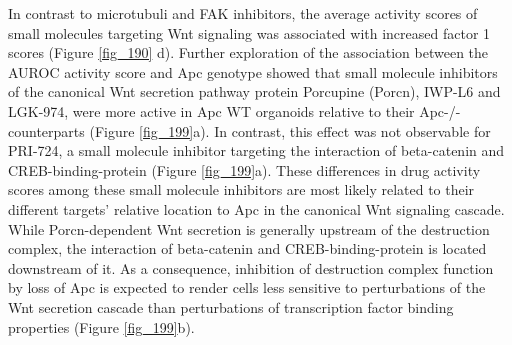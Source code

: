 \begin{flushleft}
In contrast to microtubuli and FAK inhibitors, the average activity scores of small molecules targeting Wnt signaling was associated with increased factor 1 scores (Figure \ref{fig_190} d). Further exploration of the association between the AUROC activity score and Apc genotype showed that small molecule inhibitors of the canonical Wnt secretion pathway protein Porcupine (Porcn), IWP-L6 and LGK-974, were more active in Apc WT organoids relative to their Apc-/- counterparts \cite{Liu2013-dh} (Figure \ref{fig_199}a). In contrast, this effect was not observable for PRI-724, a small molecule inhibitor targeting the interaction of beta-catenin and CREB-binding-protein \cite{Okazaki2019-gy} (Figure \ref{fig_199}a). These differences in drug activity scores among these small molecule inhibitors are most likely related to their different targets' relative location to Apc in the canonical Wnt signaling cascade. While Porcn-dependent Wnt secretion is generally upstream of the destruction complex, the interaction of beta-catenin and CREB-binding-protein is located downstream of it. As a consequence, inhibition of destruction complex function by loss of Apc is expected to render cells less sensitive to perturbations of the Wnt secretion cascade than perturbations of transcription factor binding properties (Figure \ref{fig_199}b). 


\end{flushleft}
